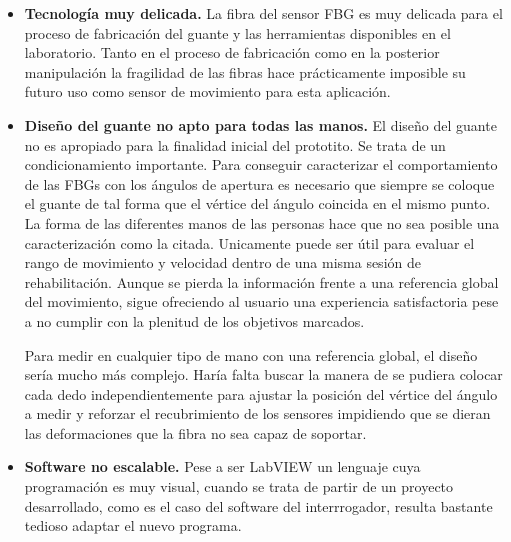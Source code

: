 \begin{itemize}
	\item \textbf{Tecnología muy delicada.} La fibra del sensor FBG es muy delicada para el proceso de fabricación del guante y las herramientas disponibles en el laboratorio. 
	Tanto en el proceso de fabricación como en la posterior manipulación la fragilidad de las fibras hace prácticamente imposible su futuro uso como sensor de movimiento para esta aplicación.
	 
	\item \textbf{Diseño del guante no apto para todas las manos.} El diseño del guante no es apropiado para la finalidad inicial del prototito. %
	Se trata de un condicionamiento importante. Para conseguir caracterizar el comportamiento de las FBGs con los ángulos de apertura es necesario que siempre se coloque el guante de tal forma que el vértice del ángulo coincida en el mismo punto. La forma de las diferentes manos de las personas hace que no sea posible una caracterización como la citada. Unicamente puede ser útil para evaluar el rango de movimiento y velocidad dentro de una misma sesión de rehabilitación. Aunque se pierda la información frente a una referencia global del movimiento, sigue ofreciendo al usuario una experiencia satisfactoria pese a no cumplir con la plenitud de los objetivos marcados.
	
	Para medir en cualquier tipo de mano con una referencia global, el diseño sería mucho más complejo. Haría falta buscar la manera de se pudiera colocar cada dedo independientemente para ajustar la posición del vértice del ángulo a medir y reforzar el recubrimiento de los sensores impidiendo que se dieran las deformaciones que la fibra no sea capaz de soportar.
	
	
	
	\item \textbf{Software no escalable.} Pese a ser LabVIEW un lenguaje cuya programación es muy visual, cuando se trata de partir de un proyecto desarrollado, como es el caso del software del interrrogador, resulta bastante tedioso adaptar el nuevo programa.
	

\end{itemize}
